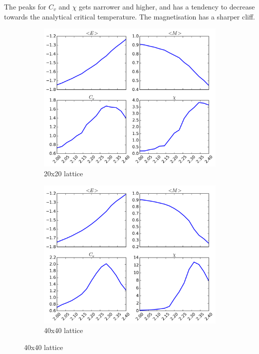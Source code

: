 \documentclass[11pt,a4paper,draft]{article}
\numberwithin{equation}{section}
\begin{document}
The peaks for $C_v$ and $\chi$ gets narrower and higher, and has a tendency
to decrease towards the analytical critical temperature. The magnetisation
has a sharper cliff.



\begin{figure}
\centering
\begin{subfigure}{0.49\textwidth}
\includegraphics[width=\textwidth]{pics/e20.png}
\caption{20x20 lattice}
\label{fig:e20}
\end{subfigure}
%
\begin{subfigure}{0.49\textwidth}
\centering
\includegraphics[width=\textwidth]{pics/e40.png}
\caption{40x40 lattice}
\label{fig:e40}
\end{subfigure}


\end{figure}
\end{document}
